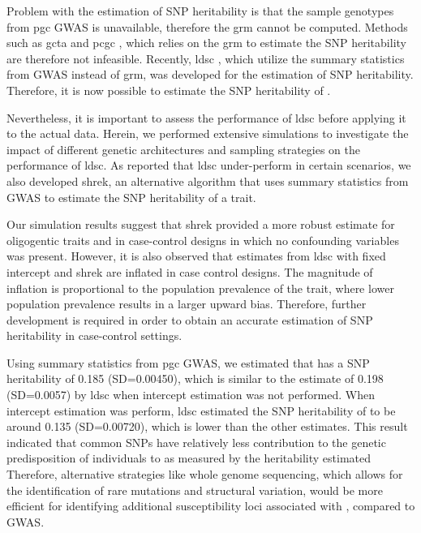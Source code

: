 \documentclass[12pt]{scrbook}
\newcommand*{\glng}{\glsentrylong}
\begin{document}
	Problem with the estimation of \gls{SNP} heritability is that the sample genotypes from \gls{pgc} \glng{scz} \gls{GWAS} is unavailable, therefore the \gls{grm} cannot be computed. 
	Methods such as \gls{gcta} \citep{Yang2011} and \gls{pcgc} \citep{Golan2014}, which relies on the \gls{grm} to estimate the \gls{SNP} heritability are therefore not infeasible.
	Recently, \gls{ldsc} \citep{Bulik-Sullivan2015}, which utilize the summary statistics from \gls{GWAS} instead of \gls{grm}, was developed for the estimation of \gls{SNP} heritability.
	Therefore, it is now possible to estimate the \gls{SNP} heritability of \glng{scz}.
	
	Nevertheless, it is important to assess the performance of \gls{ldsc} before applying it to the actual \glng{scz} data.
	Herein, we performed extensive simulations to investigate the impact of different genetic architectures and sampling strategies on the performance of \gls{ldsc}.
	As \citet{Bulik-Sullivan2015} reported that \gls{ldsc} under-perform in certain scenarios, we also developed \gls{shrek}, an alternative algorithm that uses summary statistics from \gls{GWAS} to estimate the \gls{SNP} heritability of a trait. 
	
	Our simulation results suggest that \gls{shrek} provided a more robust estimate for oligogentic traits and in case-control designs in which no confounding variables was present.
	However, it is also observed that estimates from \gls{ldsc} with fixed intercept and \gls{shrek} are inflated in case control designs.
	The magnitude of inflation is proportional to the population prevalence of the trait, where lower population prevalence results in a larger upward bias. 
	Therefore, further development is required in order to obtain an accurate estimation of \gls{SNP} heritability in case-control settings.
	
	Using summary statistics from \gls{pgc} \glng{scz} \gls{GWAS}, we estimated that \glng{scz} has a \gls{SNP} heritability of 0.185 (SD=0.00450), which is similar to the estimate of 0.198 (SD=0.0057) by \gls{ldsc} when intercept estimation was not performed.
	When intercept estimation was perform, \gls{ldsc} estimated the \gls{SNP} heritability of \glng{scz} to be around 0.135 (SD=0.00720), which is lower than the other estimates. 
	This result indicated that common \glspl{SNP} have relatively less contribution to the genetic predisposition of individuals to \glng{scz} as measured by the heritability estimated
	Therefore, alternative strategies like whole genome sequencing, which allows for the identification of rare mutations and structural variation,  would be more efficient for identifying additional susceptibility loci associated with \glng{scz}, compared to \gls{GWAS}.
	
\end{document}

